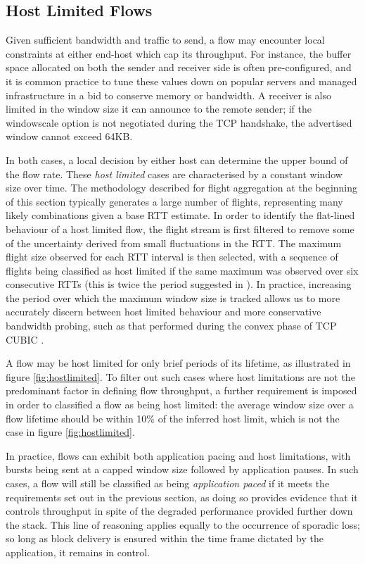 \subsection{Host Limited Flows}
\label{section:rate:host}

Given sufficient bandwidth and traffic to send, a flow may encounter local constraints at either end-host which cap its throughput. 
For instance, the buffer space allocated on both the sender and receiver side is often pre-configured, and it is common practice to tune these values down on popular servers and managed infrastructure in a bid to conserve memory or bandwidth.
A receiver is also limited in the window size it can announce to the remote sender; if the windowscale option \cite{jacobson1992tcp} is not negotiated during the \ac{TCP} handshake, the advertised window cannot exceed 64KB.

In both cases, a local decision by either host can determine the upper bound of the flow rate.
These \emph{host limited} cases are characterised by a constant window size over time.
The methodology described for flight aggregation at the beginning of this section typically generates a large number of flights, representing many likely combinations given a base \ac{RTT} estimate.
In order to identify the flat-lined behaviour of a host limited flow, the flight stream is first filtered to remove some of the uncertainty derived from small fluctuations in the \ac{RTT}.
The maximum flight size observed for each \ac{RTT} interval is then selected, with a sequence of flights being classified as host limited if the same maximum was observed over six consecutive \acp{RTT} (this is twice the period suggested in \cite{Zhang:2002p85}).
In practice, increasing the period over which the maximum window size is tracked allows us to more accurately discern between host limited behaviour and more conservative bandwidth probing, such as that performed during the convex phase of \ac{TCP} CUBIC \cite{Ha:2008p471}.

A flow may be host limited for only brief periods of its lifetime, as illustrated in figure \ref{fig:hostlimited}.
To filter out such cases where host limitations are not the predominant factor in defining flow throughput, a further requirement is imposed in order to classified a flow as being host limited: the average window size over a flow lifetime should be within 10\% of the inferred host limit, which is not the case in figure \ref{fig:hostlimited}.

In practice, flows can exhibit both application pacing and host limitations, with bursts being sent at a capped window size followed by application pauses.
In such cases, a flow will still be classified as being \emph{application paced} if it meets the requirements set out in the previous section, as doing so provides evidence that it controls throughput in spite of the degraded performance provided further down the stack. 
This line of reasoning applies equally to the occurrence of sporadic loss; so long as block delivery is ensured within the time frame dictated by the application, it remains in control.

